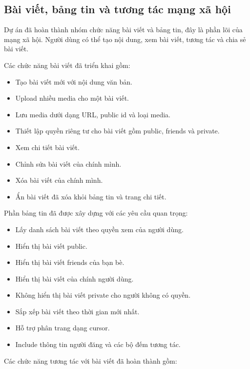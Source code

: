 \documentclass[12pt,a4paper]{article}
\begin{document}
\subsection{Bài viết, bảng tin và tương tác mạng xã hội}

Dự án đã hoàn thành nhóm chức năng bài viết và bảng tin, đây là phần lõi của mạng xã hội. Người dùng có thể tạo nội dung, xem bài viết, tương tác và chia sẻ bài viết.

Các chức năng bài viết đã triển khai gồm:

\begin{itemize}
  \item Tạo bài viết mới với nội dung văn bản.
  \item Upload nhiều media cho một bài viết.
  \item Lưu media dưới dạng URL, public id và loại media.
  \item Thiết lập quyền riêng tư cho bài viết gồm public, friends và private.
  \item Xem chi tiết bài viết.
  \item Chỉnh sửa bài viết của chính mình.
  \item Xóa bài viết của chính mình.
  \item Ẩn bài viết đã xóa khỏi bảng tin và trang chi tiết.
\end{itemize}

Phần bảng tin đã được xây dựng với các yêu cầu quan trọng:

\begin{itemize}
  \item Lấy danh sách bài viết theo quyền xem của người dùng.
  \item Hiển thị bài viết public.
  \item Hiển thị bài viết friends của bạn bè.
  \item Hiển thị bài viết của chính người dùng.
  \item Không hiển thị bài viết private cho người không có quyền.
  \item Sắp xếp bài viết theo thời gian mới nhất.
  \item Hỗ trợ phân trang dạng cursor.
  \item Include thông tin người đăng và các bộ đếm tương tác.
\end{itemize}

Các chức năng tương tác với bài viết đã hoàn thành gồm:
\end{document}
